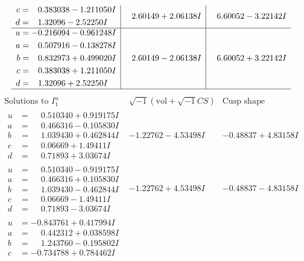\documentclass[1p]{elsarticle_modified}
\theoremstyle{definition}
\newcommand{\I}{\sqrt{-1}}
\begin{document}
$$\begin{array}{c|c|c}
\begin{aligned}
c &= \phantom{-}0.383038 - 1.211050 I \\
d &= \phantom{-}1.32096 - 2.52250 I\end{aligned}
 & \phantom{-}2.60149 + 2.06138 I & \phantom{-}6.60052 - 3.22142 I \\ \hline\begin{aligned}
u &= -0.216094 - 0.961248 I \\
a &= \phantom{-}0.507916 - 0.138278 I \\
b &= \phantom{-}0.832973 + 0.499020 I \\
c &= \phantom{-}0.383038 + 1.211050 I \\
d &= \phantom{-}1.32096 + 2.52250 I\end{aligned}
 & \phantom{-}2.60149 - 2.06138 I & \phantom{-}6.60052 + 3.22142 I\\
 \hline 
 \end{array}$$\newpage$$\begin{array}{c|c|c}  
\text{Solutions to }I^u_{1}& \I (\text{vol} + \sqrt{-1}CS) & \text{Cusp shape}\\
 \hline 
\begin{aligned}
u &= \phantom{-}0.510340 + 0.919175 I \\
a &= \phantom{-}0.466316 - 0.105830 I \\
b &= \phantom{-}1.039430 + 0.462844 I \\
c &= \phantom{-}0.06669 + 1.49411 I \\
d &= \phantom{-}0.71893 + 3.03674 I\end{aligned}
 & -1.22762 - 4.53498 I & -0.48837 + 4.83158 I \\ \hline\begin{aligned}
u &= \phantom{-}0.510340 - 0.919175 I \\
a &= \phantom{-}0.466316 + 0.105830 I \\
b &= \phantom{-}1.039430 - 0.462844 I \\
c &= \phantom{-}0.06669 - 1.49411 I \\
d &= \phantom{-}0.71893 - 3.03674 I\end{aligned}
 & -1.22762 + 4.53498 I & -0.48837 - 4.83158 I \\ \hline\begin{aligned}
u &= -0.843761 + 0.417994 I \\
a &= \phantom{-}0.442312 + 0.038598 I \\
b &= \phantom{-}1.243760 - 0.195802 I \\
c &= -0.734788 + 0.784462 I \\

\end{aligned}
\end{array}$$
\end{document}
